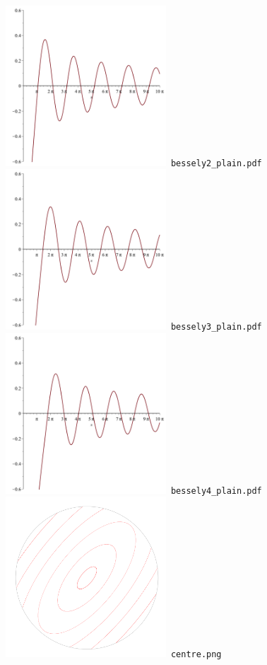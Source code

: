 \documentclass[a4paper]{amsart}
\begin{document}
\includegraphics[width=6cm]{bessely2_plain.pdf}\verb+ bessely2_plain.pdf+\\
\includegraphics[width=6cm]{bessely3_plain.pdf}\verb+ bessely3_plain.pdf+\\
\includegraphics[width=6cm]{bessely4_plain.pdf}\verb+ bessely4_plain.pdf+\\
\includegraphics[width=6cm]{centre.png}\verb+ centre.png+\\
\end{document}
